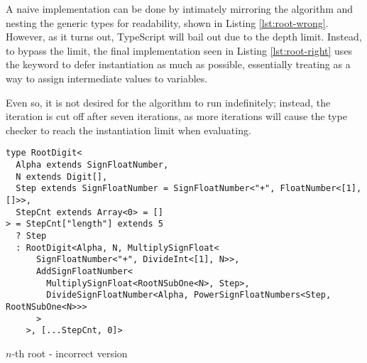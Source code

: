 A naive implementation can be done by intimately mirroring the algorithm and nesting the generic types for readability, shown in Listing \ref{lst:root-wrong}. However, as it turns out, TypeScript will bail out due to the depth limit. Instead, to bypass the limit, the final implementation seen in Listing \ref{lst:root-right} uses the  keyword to defer instantiation as much as possible, essentially treating  as a way to assign intermediate values to variables.

Even so, it is not desired for the algorithm to run indefinitely; instead, the iteration is cut off after seven iterations, as more iterations will cause the type checker to reach the instantiation limit when evaluating.

\begin{listing}[ht]
  \begin{verbatim}
type RootDigit<
  Alpha extends SignFloatNumber,
  N extends Digit[],
  Step extends SignFloatNumber = SignFloatNumber<"+", FloatNumber<[1], []>>,
  StepCnt extends Array<0> = []
> = StepCnt["length"] extends 5
  ? Step
  : RootDigit<Alpha, N, MultiplySignFloat<
      SignFloatNumber<"+", DivideInt<[1], N>>,
      AddSignFloatNumber<
        MultiplySignFloat<RootNSubOne<N>, Step>,
        DivideSignFloatNumber<Alpha, PowerSignFloatNumbers<Step, RootNSubOne<N>>>
      >
    >, [...StepCnt, 0]>
\end{verbatim}
  \caption{$n$-th root - incorrect version}\label{lst:root-wrong}
\end{listing}

